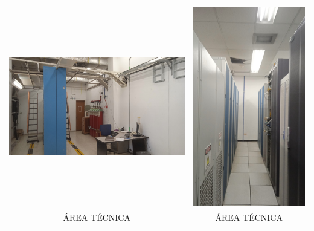 \documentclass[12pt,a4paper,twoside]{article}
\begin{document}
\begin{tabular}{ c c }
	\includegraphics[width = 7 cm]{Imagenes/5} & \includegraphics[width = 3 cm]{Imagenes/6} \\
	ÁREA TÉCNICA  & ÁREA TÉCNICA   \\

	
\end{tabular} 
\end{document}
